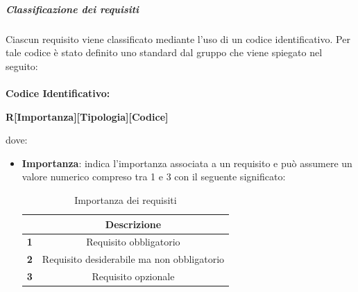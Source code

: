             \subparagraph{Classificazione dei requisiti} \label{subparagraph:Classificazione dei requisiti}
            Ciascun requisito viene classificato mediante l'uso di un codice identificativo. Per tale codice è stato definito uno standard dal gruppo che viene spiegato nel seguito:\\\\
            \textbf{Codice Identificativo:}\\
            \begin{center}
                \textbf{\Large{R[Importanza][Tipologia][Codice]}}
            \end{center}
            dove:
            \begin{itemize}[label={}]
                \item \textbf{Importanza}: indica l'importanza associata a un requisito e può assumere un valore numerico compreso tra 1 e 3 con il seguente significato:
                
                \begin{table}[H]
                    \centering
                    \renewcommand{\arraystretch}{1.8}
                    \begin{tabular}{c|c}
                        \rowcolor[HTML]{125E28} 
                        \multicolumn{1}{c}{\color[HTML]{FFFFFF}\textbf{Numero}}
                        & \multicolumn{1}{c}{\color[HTML]{FFFFFF}\textbf{Descrizione}}\\
                        \hline
                        \textbf{1} & Requisito obbligatorio\\
                        \textbf{2} & Requisito desiderabile ma non obbligatorio\\
                        \textbf{3} & Requisito opzionale\\
                    \end{tabular}
                    \caption{Importanza dei requisiti}
                \end{table}
                

\end{itemize}
